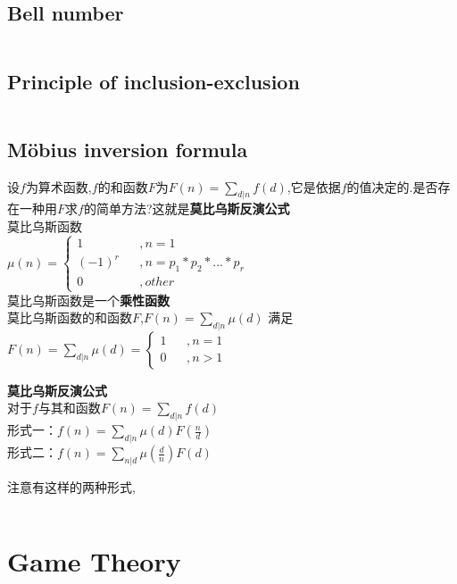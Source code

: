 \documentclass[a4paper,10pt]{article}
\begin{document}
			\subsection{Bell number}
				\inputminted[breaklines]{c++}{Math/Bell.cc}
			\subsection{Principle of inclusion-exclusion} %
				\inputminted[breaklines]{c++}{Math/rongchi.cc}
			\subsection{Möbius inversion formula} %
				
					设$f$为算术函数,$f$的和函数$F$为$F(n)=\sum_{d|n}f(d)$,它是依据$f$的值决定的.是否存在一种用$F$求$f$的简单方法?这就是\textbf{莫比乌斯反演公式}\\
					
					莫比乌斯函数\\
					
					$ \mu(n) = \left\{\begin{array}{rcl} 1 && ,n=1\\ (-1)^r && ,n=p_1*p_2*...*p_r \\0 && ,other \end{array}\right.$\\
					
					莫比乌斯函数是一个\textbf{乘性函数}\\
					
					莫比乌斯函数的和函数$F$,$F(n) = \sum_{d|n} \mu (d)$ 满足
					$ F(n) = \sum_{d|n}\mu(d) = \left\{\begin{array}{rcl} 1 && ,n=1  \\0 && ,n>1 \end{array}\right.$
					
					\textbf{莫比乌斯反演公式}\\
					对于$f$与其和函数$F(n)=\sum_{d|n}f(d)$\\
					形式一：$f(n) = \sum_{d|n}\mu(d)F(\frac{n}{d})$\\
					形式二：$f(n) = \sum_{n|d}\mu(\frac{d}{n})F(d)$
					
					注意有这样的两种形式,
				
				\inputminted[breaklines]{c++}{Math/mobius.cc}
        
		\newpage
		\section{Game Theory}
\end{document}
